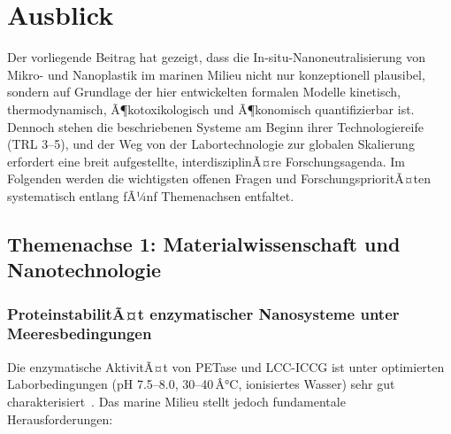 ﻿\documentclass[12pt,a4paper]{article}
\theoremstyle{definition}
\theoremstyle{remark}
\begin{document}
\section{Ausblick}
\label{sec:ausblick}

Der vorliegende Beitrag hat gezeigt, dass die In-situ-Nanoneutralisierung von
Mikro- und Nanoplastik im marinen Milieu nicht nur konzeptionell plausibel,
sondern auf Grundlage der hier entwickelten formalen Modelle
kinetisch, thermodynamisch, Ã¶kotoxikologisch und Ã¶konomisch quantifizierbar ist.
Dennoch stehen die beschriebenen Systeme am Beginn ihrer Technologiereife
(TRL 3--5), und der Weg von der Labortechnologie zur globalen Skalierung
erfordert eine breit aufgestellte, interdisziplinÃ¤re Forschungsagenda.
Im Folgenden werden die wichtigsten offenen Fragen und ForschungsprioritÃ¤ten
systematisch entlang fÃ¼nf Themenachsen entfaltet.

\subsection{Themenachse 1: Materialwissenschaft und Nanotechnologie}

\subsubsection{ProteinstabilitÃ¤t enzymatischer Nanosysteme unter Meeresbedingungen}

Die enzymatische AktivitÃ¤t von PETase und LCC-ICCG ist unter optimierten
Laborbedingungen (pH 7.5--8.0, 30--40\,Â°C, ionisiertes Wasser) sehr gut
charakterisiert~\cite{tournier2020engineered}. Das marine Milieu stellt
jedoch fundamentale Herausforderungen:
\end{document}
